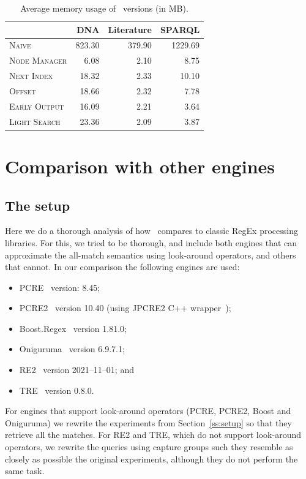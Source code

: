 \begin{table}[t]
	\begin{tabular}{l|rrr}
		                      & \textsf{DNA} & \textsf{Literature} &
		                      \textsf{SPARQL} \\
		\hline
		\textsc{Naive}        & 823.30        & 379.90               & 1229.69
		\\
		\textsc{Node Manager} & 6.08         & 2.10                 & 8.75 \\
		\textsc{Next Index}   & 18.32        & 2.33                & 10.10 \\
		\textsc{Offset}       & 18.66        & 2.32                & 7.78 \\
		\textsc{Early Output} & 16.09        & 2.21                & 3.64 \\
		\textsc{Light Search} & 23.36        & 2.09                & 3.87
	\end{tabular}
	\caption{Average memory usage of \rematch\ versions (in MB).}
	\label{tab-memory}
\end{table}

\section{Comparison with other engines}\label{ss:comp}


\subsection{The setup}
Here we do a thorough analysis of how \rematch\ compares to classic RegEx
processing libraries. For this, we tried to be thorough, and include both
engines that can approximate the all-match semantics using look-around
operators, and others that cannot. In our comparison the following engines are
used:
\begin{itemize}
	\item \textsf{PCRE}~\citep{pcre} version: 8.45;
	\item \textsf{PCRE2}~\citep{pcre2} version 10.40 (using JPCRE2 C++
	wrapper~\citep{wrapper});
	\item \textsf{Boost.Regex}~\citep{boost} version 1.81.0;
	\item \textsf{Oniguruma}~\citep{oniguruma} version 6.9.7.1;
	\item \textsf{RE2}~\citep{re2} version 2021--11--01; and
	\item \textsf{TRE}~\citep{tre} version 0.8.0.
\end{itemize}
For engines that support look-around operators (\textsf{PCRE}, \textsf{PCRE2},
\textsf{Boost} and \textsf{Oniguruma}) we rewrite the experiments from
Section~\ref{ss:setup} so that they retrieve all the matches. For \textsf{RE2}
and \textsf{TRE}, which do not support look-around operators, we rewrite the
queries using capture groups such they resemble as closely as possible the
original experiments, although they do not perform the same task.


